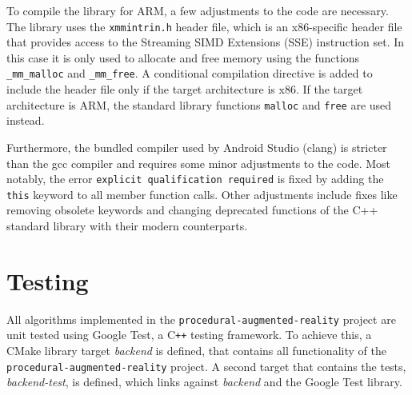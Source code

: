 To compile the library for ARM, a few adjustments to the code are necessary.
The library uses the \texttt{xmmintrin.h} header file, which is an x86-specific header file
that provides access to the Streaming SIMD Extensions (SSE) instruction set. %
In this case it is only used to allocate and free memory using the functions \texttt{\_mm\_malloc} and \texttt{\_mm\_free}.
A conditional compilation directive is added to include the header file only if the target architecture is x86.
If the target architecture is ARM, the standard library functions \texttt{malloc} and \texttt{free} are used instead.

Furthermore, the bundled compiler used by Android Studio (clang)
is stricter than the gcc compiler and requires some minor adjustments to the code.
Most notably, the error \texttt{explicit qualification required} is fixed by adding the
\texttt{this} keyword to all member function calls.
Other adjustments include fixes like removing obsolete keywords and changing deprecated
functions of the C++ standard library with their modern counterparts.


\section{Testing}

All algorithms implemented in the \texttt{procedural-augmented-reality} project are unit tested using
Google Test, a C\texttt{++} testing framework.
To achieve this, a CMake library target \textit{backend} is defined,
that contains all functionality of the \texttt{procedural-augmented-reality} project.
A second target that contains the tests, \textit{backend-test}, is defined,
which links against \textit{backend} and the Google Test library.
